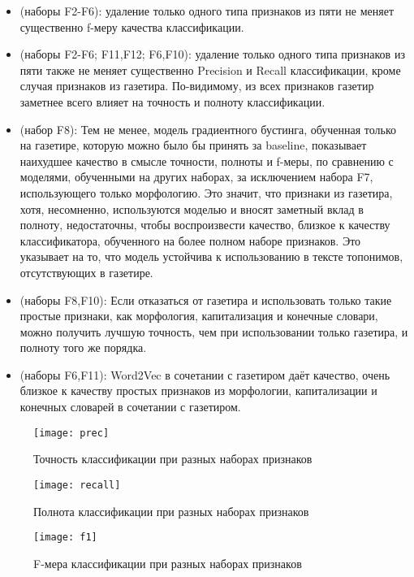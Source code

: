 \documentclass[14pt,russian]{extreport}
\begin{document}
\begin{itemize}
  \item (наборы F2-F6): удаление только одного типа признаков из пяти не меняет существенно
    f-меру качества классификации.
  \item (наборы F2-F6; F11,F12; F6,F10): удаление только одного типа признаков
    из пяти также не меняет существенно Precision и Recall классификации, кроме
    случая признаков из газетира. По-видимому, из всех признаков газетир
    заметнее всего влияет на точность и полноту классификации.
  \item (набор F8): Тем не менее, модель градиентного бустинга, обученная
    только на газетире, которую можно было бы принять за baseline, показывает
    наихудшее качество в смысле точности, полноты и f-меры, по сравнению с
    моделями, обученными на других наборах, за исключением набора F7,
    использующего только морфологию. Это значит, что признаки из газетира,
    хотя, несомненно, используются моделью и вносят заметный вклад в полноту,
    недостаточны, чтобы воспроизвести качество, близкое к качеству
    классификатора, обученного на более полном наборе признаков. Это указывает
    на то, что модель устойчива к использованию в тексте топонимов,
    отсутствующих в газетире.
  \item (наборы F8,F10): Если отказаться от газетира и использовать только такие
    простые признаки, как морфология, капитализация и конечные словари, можно
    получить лучшую точность, чем при использовании только газетира, и полноту
    того же порядка.
  \item (наборы F6,F11): Word2Vec в сочетании с газетиром даёт качество, очень
    близкое к качеству простых признаков из морфологии, капитализации и
    конечных словарей в сочетании с газетиром.
\end{itemize}

\begin{figure}[p]
  \centering
  \texttt{[image: prec]}
  \caption{Точность классификации при разных наборах признаков}
  \label{pic:feature-sets-prec}
\end{figure}

\begin{figure}[p]
  \centering
  \texttt{[image: recall]}
  \caption{Полнота классификации при разных наборах признаков}
  \label{pic:feature-sets-recall}
\end{figure}

\begin{figure}[p]
  \centering
  \texttt{[image: f1]}
  \caption{F-мера классификации при разных наборах признаков}
  \label{pic:feature-sets-f1}
\end{figure}
\end{document}
